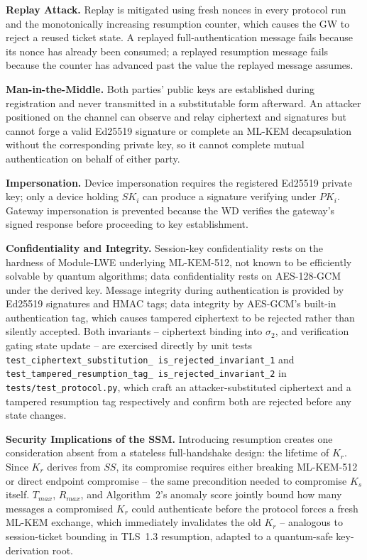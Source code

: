 \documentclass[conference]{IEEEtran}
\begin{document}
\textbf{Replay Attack.} Replay is mitigated using fresh nonces in every
protocol run and the monotonically increasing resumption counter, which
causes the GW to reject a reused ticket state. A replayed full-authentication
message fails because its nonce has already been consumed; a replayed
resumption message fails because the counter has advanced past the value
the replayed message assumes.

\textbf{Man-in-the-Middle.} Both parties' public keys are established
during registration and never transmitted in a substitutable form
afterward. An attacker positioned on the channel can observe and relay
ciphertext and signatures but cannot forge a valid Ed25519 signature or
complete an ML-KEM decapsulation without the corresponding private key, so
it cannot complete mutual authentication on behalf of either party.

\textbf{Impersonation.} Device impersonation requires the registered
Ed25519 private key; only a device holding $SK_i$ can produce a signature
verifying under $PK_i$. Gateway impersonation is prevented because the WD
verifies the gateway's signed response before proceeding to key
establishment.

\textbf{Confidentiality and Integrity.} Session-key confidentiality rests
on the hardness of Module-LWE underlying ML-KEM-512, not known to be
efficiently solvable by quantum algorithms; data confidentiality rests on
AES-128-GCM under the derived key. Message integrity during authentication
is provided by Ed25519 signatures and HMAC tags; data integrity by
AES-GCM's built-in authentication tag, which causes tampered ciphertext to
be rejected rather than silently accepted. Both invariants -- ciphertext
binding into $\sigma_2$, and verification gating state update -- are
exercised directly by unit tests \texttt{test\_ciphertext\_substitution\_
is\_rejected\_invariant\_1} and \texttt{test\_tampered\_resumption\_tag\_
is\_rejected\_invariant\_2} in \texttt{tests/test\_protocol.py}, which craft
an attacker-substituted ciphertext and a tampered resumption tag
respectively and confirm both are rejected before any state changes.

\textbf{Security Implications of the SSM.} Introducing resumption creates
one consideration absent from a stateless full-handshake design: the
lifetime of $K_r$. Since $K_r$ derives from $SS$, its compromise requires
either breaking ML-KEM-512 or direct endpoint compromise -- the same
precondition needed to compromise $K_s$ itself. $T_{max}$, $R_{max}$, and
Algorithm~2's anomaly score jointly bound how many messages a compromised
$K_r$ could authenticate before the protocol forces a fresh ML-KEM
exchange, which immediately invalidates the old $K_r$ -- analogous to
session-ticket bounding in TLS~1.3 resumption, adapted to a quantum-safe
key-derivation root.
\end{document}
